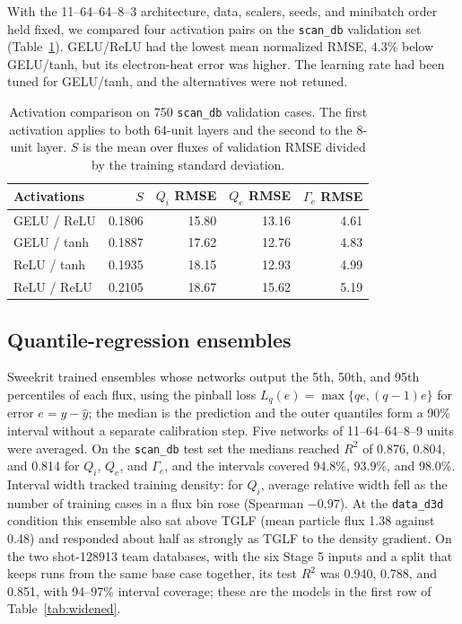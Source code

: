 \documentclass[12pt,letterpaper]{article}
\begin{document}
With the 11--64--64--8--3 architecture, data, scalers, seeds, and minibatch order held
fixed, we compared four activation pairs on the \texttt{scan\_db} validation set
(Table~\ref{tab:activations}). GELU/ReLU had the lowest mean normalized RMSE, 4.3\% below
GELU/tanh, but its electron-heat error was higher. The learning rate had been tuned for
GELU/tanh, and the alternatives were not retuned.

\begin{table}[H]
  \centering
  \small
  \begin{tabular}{lrrrr}
    \toprule
    Activations & $S$ & $Q_i$ RMSE & $Q_e$ RMSE & $\Gamma_e$ RMSE \\
    \midrule
    GELU / ReLU & 0.1806 & 15.80 & 13.16 & 4.61 \\
    GELU / tanh & 0.1887 & 17.62 & 12.76 & 4.83 \\
    ReLU / tanh & 0.1935 & 18.15 & 12.93 & 4.99 \\
    ReLU / ReLU & 0.2105 & 18.67 & 15.62 & 5.19 \\
    \bottomrule
  \end{tabular}
  \caption{Activation comparison on 750 \texttt{scan\_db} validation cases. The first
    activation applies to both 64-unit layers and the second to the 8-unit layer. $S$ is
    the mean over fluxes of validation RMSE divided by the training standard deviation.}
  \label{tab:activations}
\end{table}

\subsection{Quantile-regression ensembles}
\label{app:quantile}

Sweekrit trained ensembles whose networks output the 5th, 50th, and 95th percentiles of
each flux, using the pinball loss $L_q(e) = \max\{qe, (q-1)e\}$ for error $e = y-\hat{y}$;
the median is the prediction and the outer quantiles form a 90\% interval without a
separate calibration step. Five networks of 11--64--64--8--9 units were averaged. On the
\texttt{scan\_db} test set the medians reached $R^2$ of 0.876, 0.804, and 0.814 for $Q_i$,
$Q_e$, and $\Gamma_e$, and the intervals covered 94.8\%, 93.9\%, and 98.0\%. Interval width
tracked training density: for $Q_i$, average relative width fell as the number of training
cases in a flux bin rose (Spearman $-0.97$). At the \texttt{data\_d3d} condition this
ensemble also sat above TGLF (mean particle flux 1.38 against 0.48) and responded about half
as strongly as TGLF to the density gradient. On the two shot-128913 team databases, with the
six Stage 5 inputs and a split that keeps runs from the same base case together, its test
$R^2$ was 0.940, 0.788, and 0.851, with 94--97\% interval coverage; these are the models in
the first row of Table~\ref{tab:widened}.
\end{document}
